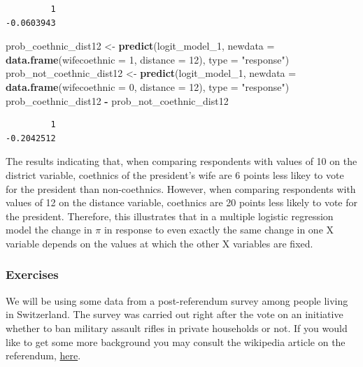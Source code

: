 \documentclass[]{article}
\newenvironment{Shaded}{\begin{snugshade}}{\end{snugshade}}
\newcommand{\KeywordTok}[1]{\textcolor[rgb]{0.13,0.29,0.53}{\textbf{#1}}}
\newcommand{\DataTypeTok}[1]{\textcolor[rgb]{0.13,0.29,0.53}{#1}}
\newcommand{\DecValTok}[1]{\textcolor[rgb]{0.00,0.00,0.81}{#1}}
\newcommand{\StringTok}[1]{\textcolor[rgb]{0.31,0.60,0.02}{#1}}
\newcommand{\OperatorTok}[1]{\textcolor[rgb]{0.81,0.36,0.00}{\textbf{#1}}}
\newcommand{\NormalTok}[1]{#1}
\theoremstyle{definition}
\theoremstyle{definition}
\theoremstyle{definition}
\theoremstyle{remark}
\begin{document}
\begin{verbatim}
         1 
-0.0603943 
\end{verbatim}

\begin{Shaded}
\begin{Highlighting}[]
\NormalTok{prob_coethnic_dist12 <-}\StringTok{ }\KeywordTok{predict}\NormalTok{(logit_model_}\DecValTok{1}\NormalTok{, }\DataTypeTok{newdata =} \KeywordTok{data.frame}\NormalTok{(}\DataTypeTok{wifecoethnic =} \DecValTok{1}\NormalTok{, }\DataTypeTok{distance =} \DecValTok{12}\NormalTok{), }\DataTypeTok{type =} \StringTok{"response"}\NormalTok{)}
\NormalTok{prob_not_coethnic_dist12 <-}\StringTok{ }\KeywordTok{predict}\NormalTok{(logit_model_}\DecValTok{1}\NormalTok{, }\DataTypeTok{newdata =} \KeywordTok{data.frame}\NormalTok{(}\DataTypeTok{wifecoethnic =} \DecValTok{0}\NormalTok{, }\DataTypeTok{distance =} \DecValTok{12}\NormalTok{), }\DataTypeTok{type =} \StringTok{"response"}\NormalTok{)}
\NormalTok{prob_coethnic_dist12 }\OperatorTok{-}\StringTok{ }\NormalTok{prob_not_coethnic_dist12}
\end{Highlighting}
\end{Shaded}

\begin{verbatim}
         1 
-0.2042512 
\end{verbatim}

The results indicating that, when comparing respondents with values of
10 on the district variable, coethnics of the president's wife are 6
points less likey to vote for the president than non-coethnics. However,
when comparing respondents with values of 12 on the distance variable,
coethnics are 20 points less likely to vote for the president.
Therefore, this illustrates that in a multiple logistic regression model
the change in \(\pi\) in response to even exactly the same change in one
X variable depends on the values at which the other X variables are
fixed.

\subsubsection{Exercises}\label{exercises-9}

We will be using some data from a post-referendum survey among people
living in Switzerland. The survey was carried out right after the vote
on an initiative whether to ban military assault rifles in private
households or not. If you would like to get some more background you may
consult the wikipedia article on the referendum,
\href{http://en.wikipedia.org/wiki/Swiss_gun_control_referendum,_2011}{here}.
\end{document}
